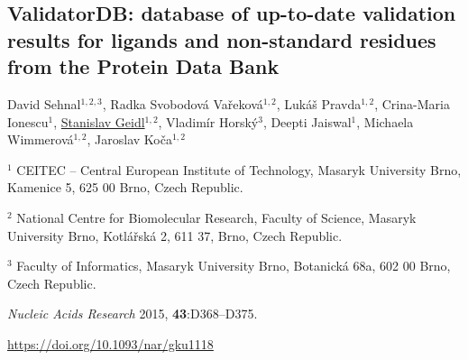 \begin{center}
\section{\centering ValidatorDB: database of up-to-date
validation results for ligands and non-standard residues from the Protein Data Bank}

David Sehnal$^{1, 2, 3}$,
Radka Svobodová Vařeková$^{1, 2}$,
Lukáš Pravda$^{1, 2}$,
Crina-Maria Ionescu$^1$,
\underline{Stanislav Geidl}$^{1, 2}$,
Vladimír Horský$^3$,
Deepti Jaiswal$^1$,
Michaela Wimmerová$^{1, 2}$,
Jaroslav Koča$^{1, 2}$

\vspace{1cm}

$^1$ CEITEC -- Central European Institute of Technology,
Masaryk University Brno, Kamenice 5, 625 00 Brno, Czech Republic.

$^2$ National Centre for Biomolecular Research, Faculty of Science,
Masaryk University Brno, Kotlářská 2, 611 37, Brno, Czech Republic.

$^3$ Faculty of Informatics, Masaryk University Brno, Botanická 68a, 602 00 Brno,
Czech Republic.

\vspace{1cm}

\textit{Nucleic Acids Research} 2015, \textbf{43}:D368--D375.

\vspace{1cm}

\url{https://doi.org/10.1093/nar/gku1118}

\end{center}



